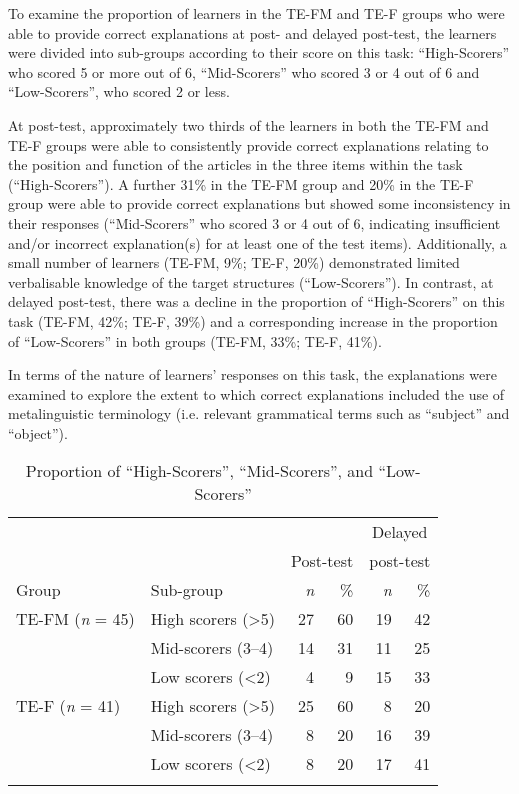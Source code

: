\documentclass[output=paper]{langscibook}
\begin{document}
To examine the proportion of learners in the TE-FM and TE-F groups who were able to provide correct explanations at post- and delayed post-test, the learners were divided into sub-groups according to their score on this task: ``High-Scorers'' who scored 5 or more out of 6, ``Mid-Scorers'' who scored 3 or 4 out of 6 and ``Low-Scorers'', who scored 2 or less. 

At post-test, approximately two thirds of the learners in both the TE-FM and TE-F groups were able to consistently provide correct explanations relating to the position and function of the articles in the three items within the task (``High-Scorers''). A further 31\% in the TE-FM group and 20\% in the TE-F group were able to provide correct explanations but showed some inconsistency in their responses (``Mid-Scorers'' who scored 3 or 4 out of 6, indicating insufficient and/or incorrect explanation(s) for at least one of the test items). Additionally, a small number of learners (TE-FM, 9\%; TE-F, 20\%) demonstrated limited verbalisable knowledge of the target structures (``Low-Scorers''). In contrast, at delayed post-test, there was a decline in the proportion of ``High-Scorers'' on this task (TE-FM, 42\%; TE-F, 39\%) and a corresponding increase in the proportion of ``Low-Scorers'' in both groups (TE-FM, 33\%; TE-F, 41\%).   

In terms of the nature of learners’ responses on this task, the explanations were examined to explore the extent to which correct explanations included the use of metalinguistic terminology (i.e. relevant grammatical terms such as ``subject'' and ``object''). 

\vfill
\begin{table}[H]
\begin{tabular}{llrrrr}
\lsptoprule
&  &  &  & \multicolumn{2}{c}{Delayed}\\
&  & \multicolumn{2}{c}{Post-test} & \multicolumn{2}{c}{post-test}\\\cmidrule(lr){3-4}\cmidrule(lr){5-6}
Group & Sub-group & \textit{n} & \% & \textit{n} & \%\\
\midrule
TE-FM
(\textit{n} = 45) & High scorers (>5) & 27 & 60 & 19 & 42\\
& Mid-scorers (3–4) & 14 & 31 & 11 & 25\\
& Low scorers (<2) & 4 & 9 & 15 & 33\\
TE-F
(\textit{n} = 41) & High scorers (>5) & 25 & 60 & 8 & 20\\
& Mid-scorers (3–4) & 8 & 20 & 16 & 39\\
& Low scorers (<2) & 8 & 20 & 17 & 41\\
\lspbottomrule
\end{tabular}
\caption{Proportion of ``High-Scorers'', ``Mid-Scorers'', and ``Low-Scorers''}
\label{tab:kasprowicz:2}
\end{table}
\end{document}
